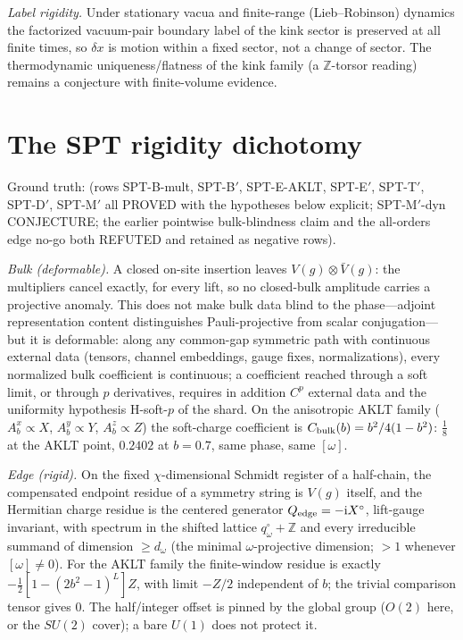 \documentclass[aps,prl,twocolumn,superscriptaddress,longbibliography,floatfix]{revtex4-2}
\newcommand{\ic}{\ensuremath{\mathrm{i}}}
\begin{document}
\emph{Label rigidity.} Under stationary vacua and finite-range
(Lieb--Robinson) dynamics the factorized vacuum-pair boundary label of the
kink sector is preserved at all finite times, so $\delta x$ is motion
within a fixed sector, not a change of sector. The thermodynamic
uniqueness/flatness of the kink family (a $\mathbb{Z}$-torsor reading)
remains a conjecture with finite-volume evidence.

\section{The SPT rigidity dichotomy}\label{app:spt}

Ground truth:  (rows SPT-B-mult, SPT-B$'$,
SPT-E-AKLT, SPT-E$'$, SPT-T$'$, SPT-D$'$, SPT-M$'$ all PROVED with the
hypotheses below explicit; SPT-M$'$-dyn CONJECTURE; the earlier pointwise
bulk-blindness claim and the all-orders edge no-go both REFUTED and
retained as negative rows).

\emph{Bulk (deformable).} A closed on-site insertion leaves
$V(g)\otimes\bar V(g)$: the multipliers cancel exactly, for every lift, so
no closed-bulk amplitude carries a projective anomaly. This does not make
bulk data blind to the phase---adjoint representation content
distinguishes Pauli-projective from scalar conjugation---but it is
deformable: along any common-gap symmetric path with continuous external
data (tensors, channel embeddings, gauge fixes, normalizations), every
normalized bulk coefficient is continuous; a coefficient reached through a
soft limit, or through $p$ derivatives, requires in addition $C^p$
external data and the uniformity hypothesis H-soft-$p$ of the shard. On the anisotropic
AKLT family ($A^x_b\!\propto\!X$, $A^y_b\!\propto\!Y$, $A^z_b\!\propto\!Z$)
the soft-charge coefficient is $C_{\rm bulk}(b)=b^2/4(1-b^2)$:
$\tfrac18$ at the AKLT point, $0.2402$ at $b=0.7$, same phase, same
$[\omega]$.

\emph{Edge (rigid).} On the fixed $\chi$-dimensional Schmidt register of a
half-chain, the compensated endpoint residue of a symmetry string is
$V(g)$ itself, and the Hermitian charge residue is the centered generator
$Q_{\rm edge}=-\ic X^\circ$, lift-gauge invariant, with spectrum in the
shifted lattice $q^\circ_\omega+\mathbb{Z}$ and every irreducible summand
of dimension $\ge d_\omega$ (the minimal $\omega$-projective dimension;
$>1$ whenever $[\omega]\neq0$). For the AKLT family the finite-window
residue is exactly $-\frac12[1-(2b^2-1)^L]Z$, with limit $-Z/2$
independent of $b$; the trivial comparison tensor gives $0$. The
half/integer offset is pinned by the global group ($O(2)$ here, or the
$SU(2)$ cover); a bare $U(1)$ does not protect it.
\end{document}

